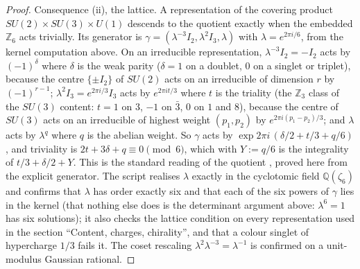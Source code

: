 \documentclass[11pt]{article}
\theoremstyle{definition}
\theoremstyle{plain}
\begin{document}
\begin{proof}
Consequence (ii), the lattice. A representation of the covering product $SU(2) \times SU(3) \times U(1)$ descends to the quotient exactly when the embedded $\mathbb{Z}_{6}$ acts trivially. Its generator is $\gamma = (\lambda^{-3}I_{2}, \lambda^{2}I_{3}, \lambda)$ with $\lambda = e^{2\pi i/6}$, from the kernel computation above. On an irreducible representation, $\lambda^{-3}I_{2} = -I_{2}$ acts by $(-1)^{\delta}$ where $\delta$ is the weak parity ($\delta = 1$ on a doublet, $0$ on a singlet or triplet), because the centre $\{\pm I_{2}\}$ of $SU(2)$ acts on an irreducible of dimension $r$ by $(-1)^{r-1}$; $\lambda^{2}I_{3} = e^{2\pi i/3}I_{3}$ acts by $e^{2\pi i t/3}$ where $t$ is the triality (the $\mathbb{Z}_{3}$ class of the $SU(3)$ content: $t = 1$ on $3$, $-1$ on $\bar{3}$, $0$ on $1$ and $8$), because the centre of $SU(3)$ acts on an irreducible of highest weight $(p_{1}, p_{2})$ by $e^{2\pi i(p_{1} - p_{2})/3}$; and $\lambda$ acts by $\lambda^{q}$ where $q$ is the abelian weight. So $\gamma$ acts by $\exp 2\pi i\,(\delta/2 + t/3 + q/6)$, and triviality is $2t + 3\delta + q \equiv 0 \pmod 6$, which with $Y := q/6$ is the integrality of $t/3 + \delta/2 + Y$. This is the standard reading of the quotient \cite{BaezHuerta2010, Tong2017}, proved here from the explicit generator. The script realises $\lambda$ exactly in the cyclotomic field $\mathbb{Q}(\zeta_{6})$ and confirms that $\lambda$ has order exactly six and that each of the six powers of $\gamma$ lies in the kernel (that nothing else does is the determinant argument above: $\lambda^{6} = 1$ has six solutions); it also checks the lattice condition on every representation used in the section ``Content, charges, chirality'', and that a colour singlet of hypercharge $1/3$ fails it. The coset rescaling $\lambda^{2}\lambda^{-3} = \lambda^{-1}$ is confirmed on a unit-modulus Gaussian rational.

\end{proof}
\end{document}
